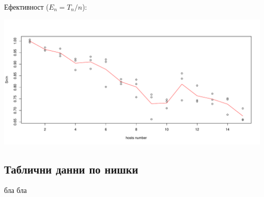 \documentclass[12pt]{extarticle}
\begin{document}
Ефективност ($E_n = T_n / n$):
\begin{center}
\includegraphics[width=\textwidth]{host_graphs/Sn_n.pdf}
\end{center}

\subsection{Таблични данни по нишки}
бла
бла
\end{document}
